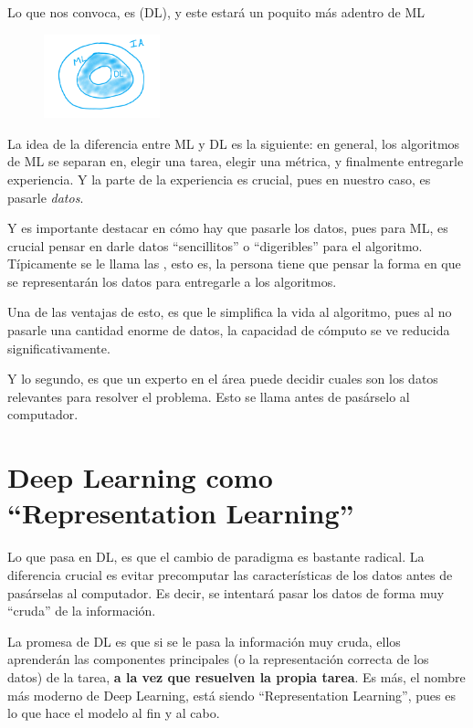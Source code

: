 Lo que nos convoca, es  (DL), y este estará un poquito más adentro de ML

\begin{figure}
  \begin{center}
    \includegraphics[width=0.3\textwidth]{img/img003.png}
  \end{center}
\end{figure}

La idea de la diferencia entre ML y DL es la siguiente: en general, los algoritmos de ML se separan en, elegir una tarea, elegir una métrica, y finalmente entregarle experiencia. Y la parte de la experiencia es crucial, pues en nuestro caso, es pasarle \textit{datos}.

Y es importante destacar en cómo hay que pasarle los datos, pues para ML, es crucial pensar en darle datos ``sencillitos'' o ``digeribles'' para el algoritmo. Típicamente se le llama las , esto es, la persona tiene que pensar la forma en que se representarán los datos para entregarle a los algoritmos.

Una de las ventajas de esto, es que le simplifica la vida al algoritmo, pues al no pasarle una cantidad enorme de datos, la capacidad de cómputo se ve reducida significativamente.

Y lo segundo, es que un experto en el área puede decidir cuales son los datos relevantes para resolver el problema. Esto se llama  antes de pasárselo al computador.

\section{Deep Learning como ``Representation Learning''}

Lo que pasa en DL, es que el cambio de paradigma es bastante radical. La diferencia crucial es evitar precomputar las características de los datos antes de pasárselas al computador. Es decir, se intentará pasar los datos de forma muy ``cruda'' de la información. 

La promesa de DL es que si se le pasa la información muy cruda, ellos aprenderán las componentes principales (o la representación correcta de los datos) de la tarea, \textbf{a la vez que resuelven la propia tarea}. Es más, el nombre más moderno de Deep Learning, está siendo ``Representation Learning'', pues es lo que hace el modelo al fin y al cabo.

